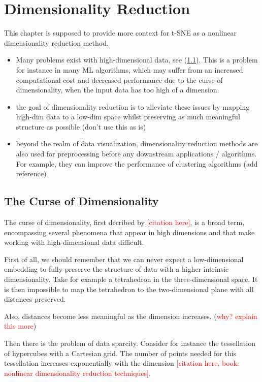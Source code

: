 \chapter{Dimensionality Reduction}\label{chapter:dimensionality-reduction}
This chapter is supposed to provide more context for t-SNE as a nonlinear dimensionality reduction method. 
\begin{itemize}
    \item Many problems exist with high-dimensional data, see (\ref{section:curse}). This is a problem for instance in many ML algorithms, which may suffer from an increased computational cost and decreased performance due to the curse of dimensionality, when the input data has too high of a dimension. 
    \item the goal of dimensionality reduction is to alleviate these issues by mapping high-dim data to a low-dim space whilst preserving as much meaningful structure as possible (don't use this as is)
    \item beyond the realm of data visualization, dimensionality reduction methods are also used for preprocessing before any downstream applications / algorithms. For example, they can improve the performance of clustering algorithms (add reference)
\end{itemize}

\section{The Curse of Dimensionality}\label{section:curse}
The curse of dimensionality, first decribed by \textcolor{red}{[citation here]}, is a broad term, encompassing several phenomena that appear in high dimensions and that make working with high-dimensional data difficult. 

First of all, we should remember that we can never expect a low-dimensional embedding to fully preserve the structure of data with a higher intrinsic dimensionality. Take for example a tetrahedron in the three-dimensional space. It is then impossible to map the tetrahedron to the two-dimensional plane with all distances preserved. 

Also, distances become less meaningful as the dimension increases. (\textcolor{red}{why? explain this more})

Then there is the problem of data sparcity. Consider for instance the tessellation of hypercubes with a Cartesian grid. The number of points needed for this tessellation increases exponentially with the dimension \textcolor{red}{[citation here, book: nonlinear dimensionality reduction techniques]}. 

